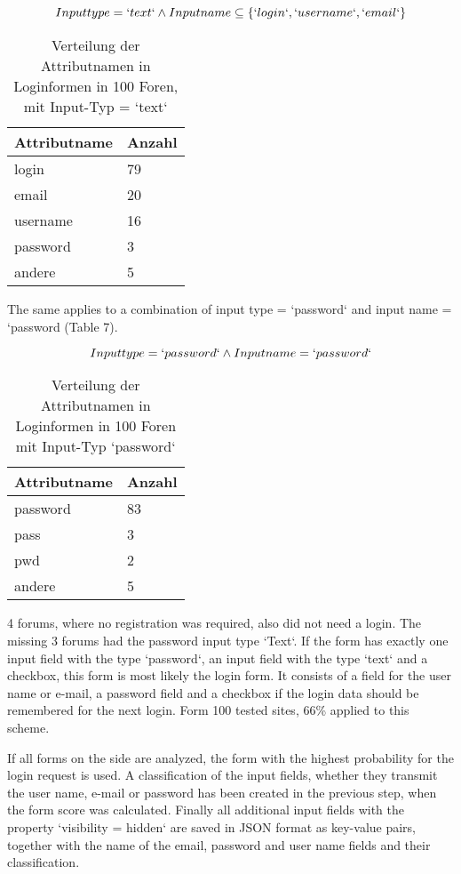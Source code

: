 \[Inputtype = `text` \wedge Inputname \subseteq \{`login`,`username`,`email`\}\]
\newpage
\begin{table}[h!]
\centering 
\begin{tabular}{ | p{3cm} | p{3cm}|} \hline
\textbf{Attributname} & \textbf{Anzahl} \\ \hline
login & 79 \\ \hline
email & 20 \\ \hline
username & 16 \\ \hline
password & 3 \\ \hline
andere & 5 \\ \hline
\end{tabular}
\caption{Verteilung der Attributnamen in Loginformen in 100 Foren, mit Input-Typ = `text`}
\end{table}

The same applies to a combination of input type = `password` and input name = `password (Table 7).

\[Inputtype = `password` \wedge Inputname = `password`\]

\begin{table}[h!]
\centering 
\begin{tabular}{ | p{3cm} | p{3cm}|} \hline
\textbf{Attributname} & \textbf{Anzahl} \\ \hline
password & 83 \\ \hline
pass & 3 \\ \hline
pwd & 2 \\ \hline
andere & 5 \\ \hline
\end{tabular}
\caption{Verteilung der Attributnamen in Loginformen in 100 Foren mit Input-Typ `password`}
\end{table}

4 forums, where no registration was required, also did not need a login. The missing 3 forums had the password input type `Text`. If the form has exactly one input field with the type `password`, an input field with the type `text` and a checkbox, this form is most likely the login form. It consists of a field for the user name or e-mail, a password field and a checkbox if the login data should be remembered for the next login.
Form 100 tested sites, 66\% applied to this scheme.

If all forms on the side are analyzed, the form with the highest probability for the login request is used. A classification of the input fields, whether they transmit the user name, e-mail or password has been created in the previous step, when the form score was calculated. Finally all additional input fields with the property `visibility = hidden` are saved in JSON format as key-value pairs, together with the name of the email, password and user name fields and their classification.

